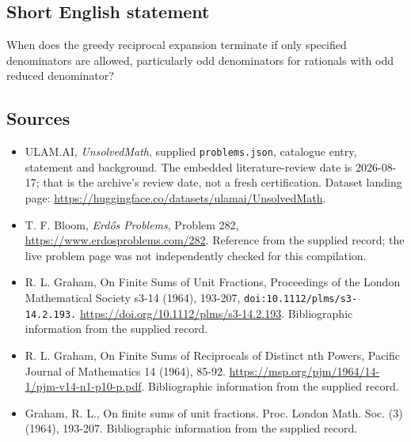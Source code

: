 \documentclass[11pt,a4paper]{article}
\begin{document}
\subsection{Short English statement}

When does the greedy reciprocal expansion terminate if only specified denominators are allowed, particularly odd denominators for rationals with odd reduced denominator?

\subsection{Sources}

{\small

\begin{itemize}

\item[\hypertarget{source:statement:1}{S1}] ULAM.AI, \emph{UnsolvedMath}, supplied \texttt{problems.json}, catalogue entry, statement and background. The embedded literature-review date is 2026-08-17; that is the archive’s review date, not a fresh certification. Dataset landing page: \url{https://huggingface.co/datasets/ulamai/UnsolvedMath}.

\item[\hypertarget{source:statement:2}{S2}] T. F. Bloom, \emph{Erdős Problems}, Problem 282, \url{https://www.erdosproblems.com/282}. Reference from the supplied record; the live problem page was not independently checked for this compilation.

\item[\hypertarget{source:statement:3}{S3}] R. L. Graham, On Finite Sums of Unit Fractions, Proceedings of the London Mathematical Society s3-14 (1964), 193-207, \nolinkurl{doi:10.1112/plms/s3-14.2.193.} \url{https://doi.org/10.1112/plms/s3-14.2.193}. Bibliographic information from the supplied record.

\item[\hypertarget{source:statement:4}{S4}] R. L. Graham, On Finite Sums of Reciprocals of Distinct nth Powers, Pacific Journal of Mathematics 14 (1964), 85-92. \url{https://msp.org/pjm/1964/14-1/pjm-v14-n1-p10-p.pdf}. Bibliographic information from the supplied record.

\item[\hypertarget{source:statement:5}{S5}] Graham, R. L., On finite sums of unit fractions. Proc. London Math. Soc. (3) (1964), 193-207. Bibliographic information from the supplied record.

\end{itemize}

}

\label{end:statement}
\end{document}
